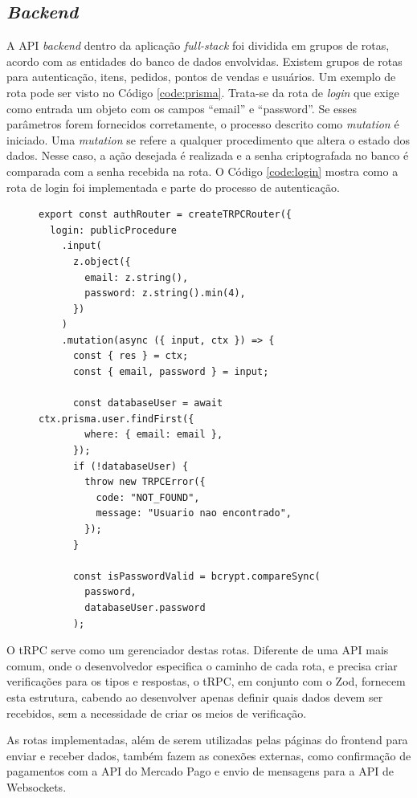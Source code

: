 \subsection{\textit{Backend}} 

A API \textit{backend} dentro da aplicação \textit{full-stack} foi dividida em grupos de rotas, acordo com as entidades do banco de dados envolvidas. Existem grupos de rotas para autenticação, itens, pedidos, pontos de vendas e usuários. Um exemplo de rota pode ser visto no Código \ref{code:prisma}. Trata-se da rota de \textit{login} que exige como entrada um objeto com os campos  ``email'' e  ``password''. Se esses parâmetros forem fornecidos corretamente, o processo descrito como \textit{mutation} é iniciado. Uma \textit{mutation} se refere a qualquer procedimento que altera o estado dos dados. Nesse caso, a ação desejada é realizada e a senha criptografada no banco é comparada com a senha recebida na rota. O Código \ref{code:login} mostra como a rota de login foi implementada e parte do processo de autenticação.

\begin{figure}[h]
\begin{lstlisting}[caption={Exemplo de uma rota tRPC.}, label={code:login}]
export const authRouter = createTRPCRouter({
  login: publicProcedure
    .input(
      z.object({
        email: z.string(),
        password: z.string().min(4),
      })
    )
    .mutation(async ({ input, ctx }) => {
      const { res } = ctx;
      const { email, password } = input;

      const databaseUser = await ctx.prisma.user.findFirst({
        where: { email: email },
      });
      if (!databaseUser) {
        throw new TRPCError({
          code: "NOT_FOUND",
          message: "Usuario nao encontrado",
        });
      }

      const isPasswordValid = bcrypt.compareSync(
        password,
        databaseUser.password
      );
\end{lstlisting}
\end{figure}

O tRPC serve como um gerenciador destas rotas. Diferente de uma API mais comum, onde o desenvolvedor especifica o caminho de cada rota, e precisa criar verificações para os tipos e respostas, o tRPC, em conjunto com o Zod, fornecem esta estrutura, cabendo ao desenvolver apenas definir quais dados devem ser recebidos, sem a necessidade de criar os meios de verificação. 

As rotas implementadas, além de serem utilizadas pelas páginas do frontend para enviar e receber dados, também fazem as conexões externas, como confirmação de pagamentos com a API do Mercado Pago e envio de mensagens para a API de Websockets.

